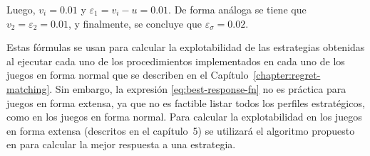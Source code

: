 Luego, $v_i = 0.01$ y $\varepsilon_1 = v_i - u = 0.01$. De forma análoga se tiene que $v_2 = \varepsilon_2 = 0.01$, y finalmente, se concluye que $\varepsilon_{\sigma} = 0.02$.

Estas fórmulas se usan para calcular la explotabilidad de las estrategias obtenidas al ejecutar cada uno de los procedimientos implementados en cada uno de los juegos en forma normal que se describen en el Capítulo~\ref{chapter:regret-matching}. Sin embargo, la expresión \ref{eq:best-response-fn} no es práctica para juegos en forma extensa, ya que no es factible listar todos los perfiles estratégicos, como en los juegos en forma normal. Para calcular la explotabilidad en los juegos en forma extensa (descritos en el capítulo~5) se utilizará el algoritmo propuesto en \cite{bib:thesis-marc-lanctot} para calcular la mejor respuesta a una estrategia. 




